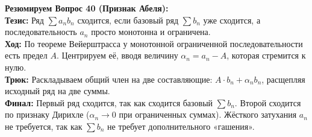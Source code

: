 \begin{tcolorbox}[colback=gray!5, colframe=black, boxrule=0.5pt, arc=0pt]
\textbf{Резюмируем Вопрос 40 (Признак Абеля):} \\
\textbf{Тезис:} Ряд $\sum a_n b_n$ сходится, если базовый ряд $\sum b_n$ уже сходится, а последовательность $a_n$ просто монотонна и ограничена. \\
\textbf{Ход:} По теореме Вейерштрасса у монотонной ограниченной последовательности есть предел $A$. Центрируем её, вводя величину $\alpha_n = a_n - A$, которая стремится к нулю. \\
\textbf{Трюк:} Раскладываем общий член на две составляющие: $A \cdot b_n + \alpha_n b_n$, расщепляя исходный ряд на две суммы. \\
\textbf{Финал:} Первый ряд сходится, так как сходится базовый $\sum b_n$. Второй сходится по признаку Дирихле ($\alpha_n \to 0$ при ограниченных суммах). Жёсткого затухания $a_n$ не требуется, так как $\sum b_n$ не требует дополнительного «гашения».
\end{tcolorbox}